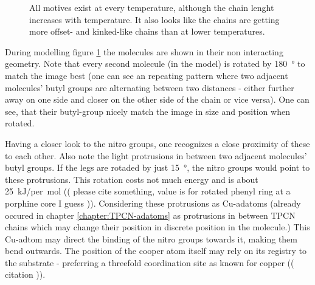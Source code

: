 \begin{figure}[h]
 \centering
  \qquad
\caption{All motives exist at every temperature, although the chain lenght increases with temperature. It also looks like the chains are getting more offset- and kinked-like chains than at lower temperatures.}
\label{fig:two-leg-trans-cu111-motivs}
\end{figure}

During modelling figure \ref{fig:two-leg-trans-cu111-motivs} the molecules are shown in their non interacting geometry. Note that every second molecule (in the model) is rotated by \SI{180}{\degree} to match the image best (one can see an repeating pattern where two adjacent molecules' butyl groups are alternating between two distances - either further away on one side and closer on the other side of the chain or vice versa). One can see, that their butyl-group nicely match the image in size and position when rotated. 

Having a closer look to the nitro groups, one recognizes a close proximity of these to each other. Also note the light protrusions in between two adjacent molecules' butyl groups. If the legs are rotaded by just \SI{15}{\degree}, the nitro groups would point to these protrusions. This rotation costs not much energy and is about \SI{25}{\kilo\J/per\mol} (( please cite something, value is for rotated phenyl ring at a porphine core I guess )). Considering these protrusions as Cu-adatoms (already occured in chapter \ref{chapter:TPCN-adatoms} as protrusions in between TPCN chains which may change their position in discrete position in the molecule.) This Cu-adtom may direct the binding of the nitro groups towards it, making them bend outwards. The position of the cooper atom itself may rely on its registry to the substrate - preferring a threefold coordination site as known for copper (( citation )).

